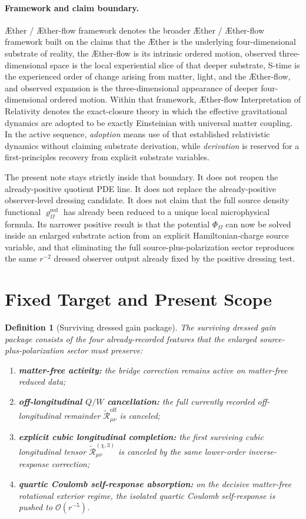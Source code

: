 \documentclass[11pt]{article}
\newcommand{\Aether}{\AE{}ther}
\newcommand{\Aflow}{\AE{}ther-flow}
\newcommand{\TheoryName}{\Aflow{} Interpretation of Relativity}
\newcommand{\TheoryProgram}{\Aether{} / \Aflow{} framework}
\newcommand{\FlowPot}{\Phi_\Omega}
\newcommand{\SourceDensityRed}{\varrho_\Omega^{\mathrm{red}}}
\newcommand{\ReOff}{\widetilde{\mathcal R}_{\mu\nu}^{\mathrm{off}}}
\newcommand{\ReLongThree}{\widetilde{\mathcal R}_{\mu\nu}^{(\chi,3)}}
\newtheorem{definition}{Definition}
\begin{document}
\paragraph{Framework and claim boundary.}
\TheoryProgram{} denotes the broader \Aether{} / \Aflow{} framework built on the claims that the \Aether{} is the underlying four-dimensional substrate of reality, the \Aflow{} is its intrinsic ordered motion, observed three-dimensional space is the local experiential slice of that deeper substrate, S-time is the experienced order of change arising from matter, light, and the \Aflow{}, and observed expansion is the three-dimensional appearance of deeper four-dimensional ordered motion. Within that framework, \TheoryName{} denotes the exact-closure theory in which the effective gravitational dynamics are adopted to be exactly Einsteinian with universal matter coupling. In the active sequence, \emph{adoption} means use of that established relativistic dynamics without claiming substrate derivation, while \emph{derivation} is reserved for a first-principles recovery from explicit substrate variables.

The present note stays strictly inside that boundary. It does not reopen the already-positive quotient PDE line. It does not replace the already-positive observer-level dressing candidate. It does not claim that the full source density functional \(\SourceDensityRed\) has already been reduced to a unique local microphysical formula. Its narrower positive result is that the potential \(\FlowPot\) can now be solved inside an enlarged substrate action from an explicit Hamiltonian-charge source variable, and that eliminating the full source-plus-polarization sector reproduces the same \(r^{-2}\) dressed observer output already fixed by the positive dressing test.

\section{Fixed Target and Present Scope}

\begin{definition}[Surviving dressed gain package]
\label{def:gains}
The \emph{surviving dressed gain package} consists of the four already-recorded features that the enlarged source-plus-polarization sector must preserve:
\begin{enumerate}
    \item \textbf{matter-free activity:} the bridge correction remains active on matter-free reduced data;
    \item \textbf{off-longitudinal \(Q/W\) cancellation:} the full currently recorded off-longitudinal remainder \(\ReOff\) is canceled;
    \item \textbf{explicit cubic longitudinal completion:} the first surviving cubic longitudinal tensor \(\ReLongThree\) is canceled by the same lower-order inverse-response correction;
    \item \textbf{quartic Coulomb self-response absorption:} on the decisive matter-free rotational exterior regime, the isolated quartic Coulomb self-response is pushed to \(\mathcal O(r^{-5})\).
\end{enumerate}
\end{definition}
\end{document}
